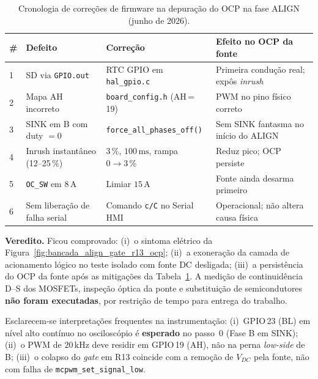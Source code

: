 \begin{table}[H]
    \centering
    \caption{Cronologia de correções de firmware na depuração do OCP na fase ALIGN (junho de 2026).}
    \label{tab:cronologia_align_ocp}
    \begin{tabular}{p{0.8cm}p{3.5cm}p{4.0cm}p{4.5cm}}
        \toprule
        \textbf{\#} & \textbf{Defeito} & \textbf{Correção} & \textbf{Efeito no OCP da fonte} \\
        \midrule
        1 & SD via \texttt{GPIO.out} & RTC GPIO em \texttt{hal\_gpio.c} & Primeira condução real; expôs \textit{inrush} \\
        2 & Mapa AH incorreto & \texttt{board\_config.h} (AH\,=\,19) & PWM no pino físico correto \\
        3 & SINK em B com duty $= 0$ & \texttt{force\_all\_phases\_off()} & Sem SINK fantasma no início do ALIGN \\
        4 & Inrush instantâneo (12--25\,\%) & 3\,\%, $100\,\text{ms}$, rampa $0 \to 3\,\%$ & Reduz pico; OCP persiste \\
        5 & \texttt{OC\_SW} em $8\,\text{A}$ & Limiar $15\,\text{A}$ & Fonte ainda desarma primeiro \\
        6 & Sem liberação de falha serial & Comando \texttt{c/C} no Serial HMI & Operacional; não altera causa física \\
        \bottomrule
    \end{tabular}
\end{table}

\textbf{Veredito.} Ficou comprovado: (i)~o sintoma elétrico da Figura~\ref{fig:bancada_align_gate_r13_ocp}; (ii)~a exoneração da camada de acionamento lógico no teste isolado com fonte DC desligada; (iii)~a persistência do OCP da fonte após as mitigações da Tabela~\ref{tab:cronologia_align_ocp}. A medição de continuidência D--S dos MOSFETs, inspeção óptica da ponte e substituição de semicondutores \textbf{não foram executadas}, por restrição de tempo para entrega do trabalho.

Esclarecem-se interpretações frequentes na instrumentação: (i)~GPIO\,23 (BL) em nível alto contínuo no osciloscópio é \textbf{esperado} no passo~0 (Fase B em SINK); (ii)~o PWM de $20\,\text{kHz}$ deve residir em GPIO\,19 (AH), não na perna \textit{low-side} de B; (iii)~o colapso do \textit{gate} em R13 coincide com a remoção de $V_{DC}$ pela fonte, não com falha de \texttt{mcpwm\_set\_signal\_low}.

